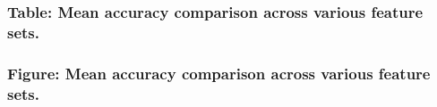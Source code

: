 \documentclass[letterpaper]{article}
\begin{document}
\subsubsection[Table: Mean accuracy comparison across various feature sets.]{\textbf{Table:} Mean accuracy comparison
across various feature sets.}

\bigskip


\bigskip

\centering
{}
\par
\subsubsection[Figure: Mean accuracy comparison across various feature sets.]{\textbf{Figure:} Mean accuracy comparison
across various feature sets.}

\bigskip


\bigskip


\bigskip


\bigskip


\bigskip
\end{document}

